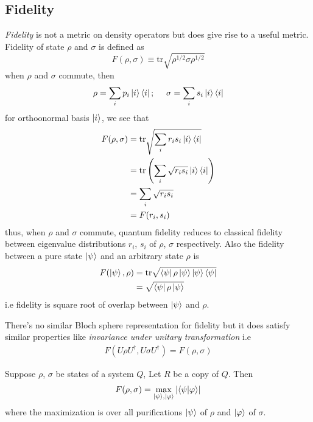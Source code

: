 \subsection{Fidelity}
\textit{Fidelity} is not a metric on  density operators but does give rise to a useful metric. Fidelity of state $\rho$ and $\sigma$ is defined as
\begin{equation}
    F(\rho, \sigma) \equiv \text{tr}\sqrt{\rho^{1/2}\sigma \rho^{1/2}}
\end{equation}
when $\rho$ and $\sigma$ commute, then
\begin{align}
    \rho = \sum_i p_i\op{i};
    \ \ \ \ 
    \sigma = \sum_i s_i\op{i}
\end{align}
for orthoonormal basis $\ket{i}$, we see that
\begin{align}
    F(\rho, \sigma) &= \text{tr}\sqrt{\sum_i r_is_i\ket{i}\bra{i}} \\
    &= \text{tr}\left( \sum_i\sqrt{r_is_i}\ket{i}\bra{i} \right) \\
    &= \sum_i \sqrt{r_is_i} \\
    &= F(r_i, s_i)
\end{align}
thus, when $\rho$ and $\sigma$ commute, quantum fidelity reduces to classical fidelity between eigenvalue distributions $r_i$, $s_i$ of $\rho$, $\sigma$ respectively. Also the fidelity between a pure state $\ket{\psi}$ and an arbitrary state $\rho$ is
\begin{align}
    F(\ket{\psi}, \rho) &= \text{tr}\sqrt{\bra{\psi}\rho\ket{\psi} \ket{\psi} \bra{\psi}} \\
    &= \sqrt{\bra{\psi}\rho\ket{\psi}}
\end{align}
i.e fidelity is square root of overlap between $\ket{\psi}$ and $\rho$.

There's no similar Bloch sphere representation for fidelity but it does satisfy similar properties like \textit{invariance under unitary transformation} i.e
\begin{align}
    F(U\rho U^\dag, U\sigma U^\dag) = F(\rho, \sigma)
\end{align}

\begin{theorem}
    Suppose $\rho$, $\sigma$ be states of a system $Q$, Let $R$ be a copy of $Q$. Then
    \begin{equation}
        F(\rho, \sigma) = \max_{\ket{\psi}, \ket{\varphi}} \left| \braket{\psi | \varphi} \right|
    \end{equation}
    where the maximization is over all purifications $\ket{\psi}$ of $\rho$ and $\ket{\varphi}$ of $\sigma$.
\end{theorem}

